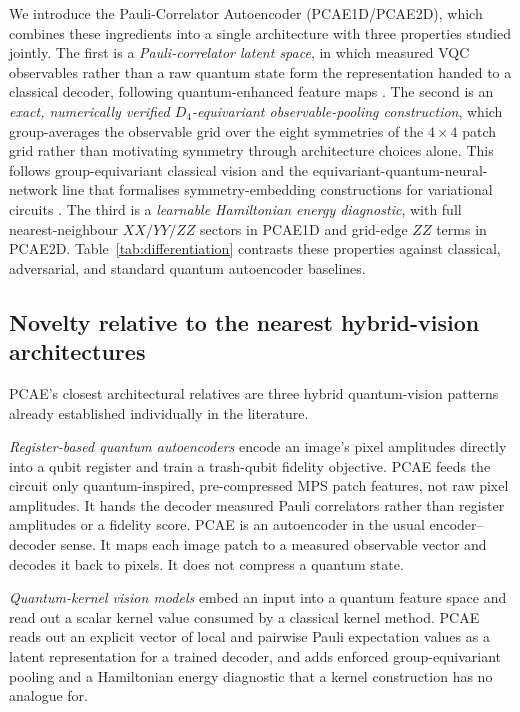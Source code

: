 \documentclass[pdflatex,sn-basic]{sn-jnl}
\begin{document}
We introduce the Pauli-Correlator Autoencoder (PCAE1D/PCAE2D), which combines these
ingredients into a single architecture with three properties studied jointly.
The first is a \emph{Pauli-correlator latent space}, in which measured VQC
observables rather than a raw quantum state form the representation handed to a
classical decoder, following quantum-enhanced feature maps \citep{Havlicek2019}.
The second is an \emph{exact, numerically verified $D_4$-equivariant
observable-pooling construction}, which group-averages the observable grid over
the eight symmetries of the $4\times4$ patch grid rather than motivating symmetry through
architecture choices alone. This follows group-equivariant classical vision
\citep{Cohen2016, Bronstein2021} and the equivariant-quantum-neural-network line
that formalises symmetry-embedding constructions for variational circuits
\citep{Meyer2023, Nguyen2024EQNN, Schatzki2024, West2024, West2024Erratum}. The
third is a \emph{learnable Hamiltonian energy diagnostic}, with full
nearest-neighbour $XX/YY/ZZ$ sectors in PCAE1D and grid-edge $ZZ$ terms in PCAE2D.
Table~\ref{tab:differentiation} contrasts these properties against classical,
adversarial, and standard quantum autoencoder baselines.

\subsection*{Novelty relative to the nearest hybrid-vision architectures}

PCAE's closest architectural relatives are three hybrid quantum-vision patterns
already established individually in the literature.

\emph{Register-based quantum autoencoders}
\citep{Romero2017, WangQAECompression2024, QAEClassification2025} encode an
image's pixel amplitudes directly into a qubit register and train a trash-qubit
fidelity objective. PCAE feeds the circuit only quantum-inspired,
pre-compressed MPS patch features, not raw pixel amplitudes. It hands the
decoder measured Pauli correlators rather than register amplitudes or a
fidelity score. PCAE is an autoencoder in the usual encoder--decoder sense.
It maps each image patch to a measured observable vector and decodes it back to
pixels. It does not compress a quantum state.

\emph{Quantum-kernel vision models}
\citep{Havlicek2019, QuantumKernelDefect2022} embed an input into a quantum
feature space and read out a scalar kernel value consumed by a classical kernel
method. PCAE reads out an explicit vector of local and pairwise Pauli expectation
values as a latent representation for a trained decoder, and adds enforced
group-equivariant pooling and a Hamiltonian energy diagnostic that a kernel
construction has no analogue for.
\end{document}
